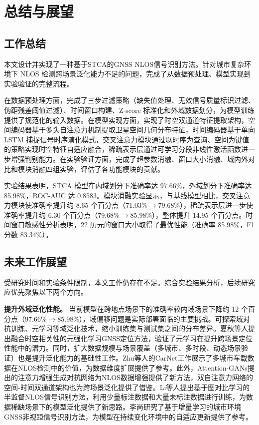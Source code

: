 \chapter{总结与展望}

\section{工作总结}

本文设计并实现了一种基于STCA的GNSS NLOS信号识别方法。针对城市复杂环境下 NLOS 检测跨场景泛化能力不足的问题，完成了从数据预处理、模型实现到实验验证的完整流程。

在数据预处理方面，完成了三步过滤策略（缺失值处理、无效信号质量标识过滤、伪距残差阈值过滤）、时间窗口构建、Z-score 标准化和外域数据划分，为模型训练提供了规范化的输入数据。在模型实现方面，实现了时空双通道特征提取架构，空间编码器基于多头自注意力机制提取卫星空间几何分布特征，时间编码器基于单向 LSTM 捕捉信号时序演化模式，交叉注意力模块通过以时序为查询、空间为键值的策略实现时空特征自适应融合，稀疏表示层通过可学习分段非线性激活函数进一步增强判别能力。在实验验证方面，完成了超参数消融、窗口大小消融、域内外对比和模块消融四组实验，评估了各功能模块的贡献。

实验结果表明，STCA 模型在内域划分下准确率达 97.66\%，外域划分下准确率达 85.98\%，ROC-AUC 达 0.8583。模块消融实验显示，与基线模型相比，交叉注意力模块使准确率提升约 8.65 个百分点（71.03\%$\rightarrow$79.68\%），稀疏表示层进一步使准确率提升约 6.30 个百分点（79.68\%$\rightarrow$85.98\%），整体提升 14.95 个百分点。时间窗口敏感性分析表明，22 历元的窗口大小取得了最优性能（准确率 85.98\%，F1 分数 83.34\%）。

\section{未来工作展望}

受研究时间和实验条件限制，本文工作仍存在不足。综合实验结果分析，后续研究应优先聚焦以下两个方向。

\textbf{提升外域泛化性能。} 当前模型在跨地点场景下的准确率较内域场景下降约 12 个百分点（97.66\%$\rightarrow$85.98\%），域偏移问题是实际部署面临的主要挑战。可探索域对抗训练、元学习等域泛化技术，缩小训练集与测试集之间的分布差异。夏秋等人\cite{xia2025meta}提出融合时空相关性的元强化学习GNSS定位方法，验证了元学习在提升跨场景定位性能中的潜力。同时，扩大数据规模与场景覆盖（多城市、多时段、动态场景验证）也是提升泛化能力的基础性工作。Zhu等人\cite{zhu2025carnet}的CarNet工作展示了多城市车载数据在NLOS检测中的价值，为数据维度扩展提供了参考。此外，Attention-GANs\cite{attention_gans2025}提出的注意力增强生成对抗网络为NLOS数据增强提供了新方法，双自注意力网络\cite{dual_self_attention2025}的空间-时间双通道架构也为跨场景泛化提供了借鉴。Li等人\cite{li2026graph}提出基于图对比学习的半监督NLOS信号识别方法，利用少量标注数据和大量未标注数据进行训练，为数据稀缺场景下的模型泛化提供了新思路。李尚\cite{li2025incremental}研究了基于增量学习的城市环境GNSS非视距信号识别方法，为模型在持续变化环境中的自适应更新提供了参考。

